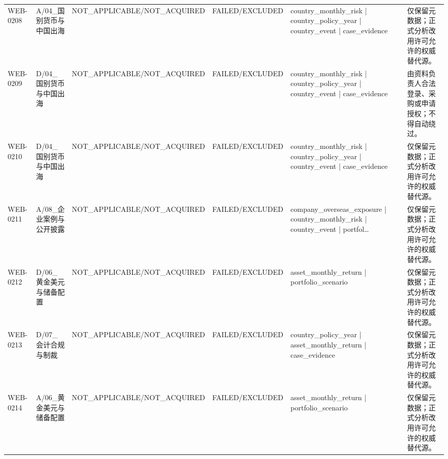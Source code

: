 \begin{landscape}
\begin{longtable}{p{1.8cm}p{2.6cm}p{2.6cm}p{2.6cm}p{4.8cm}p{7.2cm}}
WEB-0208 & A/\allowbreak{}04\_\allowbreak{}国别货币与中国出海 & NOT\_\allowbreak{}APPLICABLE/\allowbreak{}NOT\_\allowbreak{}ACQUIRED & FAILED/\allowbreak{}EXCLUDED & country\_\allowbreak{}monthly\_\allowbreak{}risk | country\_\allowbreak{}policy\_\allowbreak{}year | country\_\allowbreak{}event | case\_\allowbreak{}evidence & 仅保留元数据；正式分析改用许可允许的权威替代源。\\
WEB-0209 & D/\allowbreak{}04\_\allowbreak{}国别货币与中国出海 & NOT\_\allowbreak{}APPLICABLE/\allowbreak{}NOT\_\allowbreak{}ACQUIRED & FAILED/\allowbreak{}EXCLUDED & country\_\allowbreak{}monthly\_\allowbreak{}risk | country\_\allowbreak{}policy\_\allowbreak{}year | country\_\allowbreak{}event | case\_\allowbreak{}evidence & 由资料负责人合法登录、采购或申请授权；不得自动绕过。\\
WEB-0210 & D/\allowbreak{}04\_\allowbreak{}国别货币与中国出海 & NOT\_\allowbreak{}APPLICABLE/\allowbreak{}NOT\_\allowbreak{}ACQUIRED & FAILED/\allowbreak{}EXCLUDED & country\_\allowbreak{}monthly\_\allowbreak{}risk | country\_\allowbreak{}policy\_\allowbreak{}year | country\_\allowbreak{}event | case\_\allowbreak{}evidence & 仅保留元数据；正式分析改用许可允许的权威替代源。\\
WEB-0211 & A/\allowbreak{}08\_\allowbreak{}企业案例与公开披露 & NOT\_\allowbreak{}APPLICABLE/\allowbreak{}NOT\_\allowbreak{}ACQUIRED & FAILED/\allowbreak{}EXCLUDED & company\_\allowbreak{}overseas\_\allowbreak{}exposure | country\_\allowbreak{}monthly\_\allowbreak{}risk | country\_\allowbreak{}event | portfol… & 仅保留元数据；正式分析改用许可允许的权威替代源。\\
WEB-0212 & D/\allowbreak{}06\_\allowbreak{}黄金美元与储备配置 & NOT\_\allowbreak{}APPLICABLE/\allowbreak{}NOT\_\allowbreak{}ACQUIRED & FAILED/\allowbreak{}EXCLUDED & asset\_\allowbreak{}monthly\_\allowbreak{}return | portfolio\_\allowbreak{}scenario & 仅保留元数据；正式分析改用许可允许的权威替代源。\\
WEB-0213 & D/\allowbreak{}07\_\allowbreak{}会计合规与制裁 & NOT\_\allowbreak{}APPLICABLE/\allowbreak{}NOT\_\allowbreak{}ACQUIRED & FAILED/\allowbreak{}EXCLUDED & country\_\allowbreak{}policy\_\allowbreak{}year | asset\_\allowbreak{}monthly\_\allowbreak{}return | case\_\allowbreak{}evidence & 仅保留元数据；正式分析改用许可允许的权威替代源。\\
WEB-0214 & A/\allowbreak{}06\_\allowbreak{}黄金美元与储备配置 & NOT\_\allowbreak{}APPLICABLE/\allowbreak{}NOT\_\allowbreak{}ACQUIRED & FAILED/\allowbreak{}EXCLUDED & asset\_\allowbreak{}monthly\_\allowbreak{}return | portfolio\_\allowbreak{}scenario & 仅保留元数据；正式分析改用许可允许的权威替代源。\\

\end{longtable}
\end{landscape}
